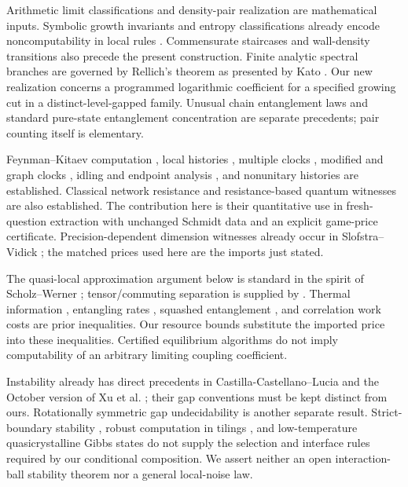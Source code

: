 Arithmetic limit classifications \cite{zheng} and density-pair
realization \cite{density} are mathematical inputs. Symbolic growth
invariants and entropy classifications already encode noncomputability
in local rules \cite{meyerovitch,hochman}. Commensurate staircases
\cite{bak,fisher,aubry} and wall-density transitions \cite{pokrovsky}
also precede the present construction. Finite analytic spectral branches
are governed by Rellich's theorem as presented by Kato \cite{kato}.
Our new realization concerns a programmed logarithmic coefficient for
a specified growing cut in a distinct-level-gapped family.
Unusual chain entanglement laws \cite{movassagh,zhang,fredkin} and
standard pure-state entanglement concentration \cite{bbps} are separate
precedents; pair counting itself is elementary.

Feynman--Kitaev computation \cite{feynman,ksv}, local histories
\cite{adkllr,agik,gi}, multiple clocks \cite{breuckmann}, modified and
graph clocks \cite{bCrosson}, idling and endpoint analysis
\cite{caha}, and nonunitary histories \cite{usher} are established.
Classical network resistance \cite{cserti,doyle} and resistance-based
quantum witnesses \cite{belovs} are also established. The contribution
here is their quantitative use in fresh-question extraction with
unchanged Schmidt data and an explicit game-price certificate.
Precision-dependent dimension witnesses already occur in
Slofstra--Vidick \cite{sv}; the matched prices used here are the
imports just stated.

The quasi-local approximation argument below is standard in the spirit
of Scholz--Werner \cite{scholz}; tensor/commuting separation is supplied
by \cite{mip}. Thermal information \cite{wolf}, entangling rates
\cite{bravyi,van}, squashed entanglement \cite{cw}, and correlation
work costs \cite{huber} are prior inequalities. Our resource bounds
substitute the imported price into these inequalities. Certified
equilibrium algorithms \cite{fawzi} do not imply computability of an
arbitrary limiting coupling coefficient.

Instability already has direct precedents in Castilla-Castellano--Lucia
\cite{instability} and the October version of Xu et al. \cite{xu}; their
gap conventions must be kept distinct from ours. Rotationally symmetric
gap undecidability \cite{rotation} is another separate result.
Strict-boundary stability \cite{miekisz,miekisznew}, robust computation
in tilings \cite{durand}, and low-temperature quasicrystalline Gibbs
states \cite{taati} do not supply the selection and interface rules
required by our conditional composition. We assert neither an open
interaction-ball stability theorem nor a general local-noise law.

